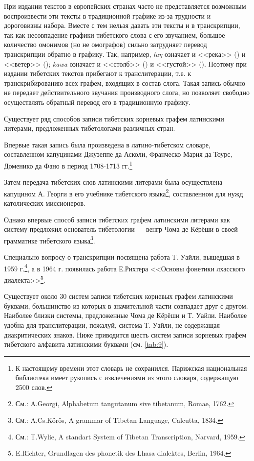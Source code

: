 При издании текстов в европейских странах часто не представляется возможным воспроизвести эти тексты в традиционной графике из-за трудности и дороговизны набора. Вместе с тем нельзя давать эти тексты и в транскрипции, так как несовпадение графики тибетского слова с его звучанием, большое количество омонимов (но не омографов) сильно затрудняет перевод транскрипции обратно в графику. Так, например, \textit{lu{\unifont ŋ}\toneR} означает и <<река>> () и <<ветер>> (); \textit{ka\toneR{}wa\toneR} означает и <<столб>> () и <<густой>> (). Поэтому при издании тибетских текстов прибегают к транслитерации, т.е. к транскрибированию всех графем, входящих в состав слога. Такая запись обычно не передает действительного звучания производного слога, но позволяет свободно осуществлять обратный перевод его в традиционную графику.

Существует ряд способов записи тибетских корневых графем латинскими литерами, предложенных тибетологами различных стран.

Впервые такая запись была произведена в латино-тибетском словаре, составленном капуцинами Джузеппе да Асколи, Франческо Мария да Тоурс, Доменико да Фано в период 1708-1713 гг.\footnote[12]{К настоящему времени этот словарь не сохранился. Парижская национальная библиотека имеет рукопись с извлечениями из этого словаря, содержащую 2500 слов.}

Затем передача тибетских слов латинскими литерами была осуществлена капуцином А. Георги в его учебнике тибетского языка\footnote[13]{См.: A.Georgi, Alphabetum tangutanum sive tibetanum, Romae, 1762.}, составленном для нужд католических миссионеров.

Однако впервые способ записи тибетских графем латинскими литерами как систему предложил основатель тибетологии --- венгр Чома де Кёрёши в своей грамматике тибетского языка\footnote[14]{См.: A.Cs.Körös, A grammar of Tibetan Language, Calcutta, 1834.}.

Специально вопросу о транскрипции посвящена работа Т. Уайли, вышедшая в 1959 г.\footnote[15]{См.: T.Wylie, A standart System of Tibetan Transcription, Narvard, 1959.}, а в 1964 г. появилась работа Е.Рихтера <<Основы фонетики лхасского диалекта>>\footnote[16]{E.Richter, Grundlagen des phonetik des Lhasa dialektes, Berlin, 1964.}.

Существует около 30 систем записи тибетских корневых графем латинскими буквами, большинство из которых в значительной части совпадает друг с другом. Наиболее близки системы, предложенные Чома де Кёрёши и Т. Уайли. Наиболее удобна для транслитерации, пожалуй, система Т. Уайли, не содержащая диакритических знаков. Ниже приводится шесть систем записи корневых графем тибетского алфавита латинскими буквами (см. \ref{tab:9}).

